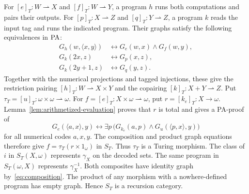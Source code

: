 For $[e]_T:W\rightharpoonup X$ and $[f]_T:W\rightharpoonup Y$,
a program $h$ runs both computations and pairs their outputs.
For $[p]_T:X\rightharpoonup Z$ and $[q]_T:Y\rightharpoonup Z$,
a program $k$ reads the input tag and runs the indicated program.
Their graphs satisfy the following equivalences in $\mathrm{PA}$:
\[
 \begin{aligned}
 G_h(w,\langle x,y\rangle)&\longleftrightarrow G_e(w,x)\land G_f(w,y),\\
 G_k(2x,z)&\longleftrightarrow G_p(x,z),\\
 G_k(2y+1,z)&\longleftrightarrow G_q(y,z).
 \end{aligned}
\]
Together with the numerical projections and tagged injections,
these give the restriction pairing $[h]_T:W\rightharpoonup X\times Y$
and the copairing $[k]_T:X+Y\rightharpoonup Z$.
Put $\tau_T=[u]_T:\omega\times\omega\rightharpoonup\omega$.
For $f=[e]_T:X\times\omega\rightharpoonup\omega$, put
$r=[k_e]_T:X\to\omega$. Lemma~\ref{lem:arithmetized-evaluation}
proves that $r$ is total and gives a PA-proof of
\[
 G_e(\langle a,x\rangle,y)\leftrightarrow
 \exists p\,
 \bigl(G_{k_e}(a,p)\land G_u(\langle p,x\rangle,y)\bigr)
\]
for all numerical codes $a,x,y$.
The composition and product graph equations therefore give
$f=\tau_T(r\times1_\omega)$ in $S_T$.
Thus $\tau_T$ is a Turing morphism. The class of $i$ in
$S_T(X,\omega)$ represents $\gamma_X$ on the decoded sets.
The same program in $S_T(\omega,X)$ represents $\gamma_X^{-1}$.
Both composites have identity graph by~\eqref{eq:composition}.
The product of any morphism with a nowhere-defined program has
empty graph. Hence $S_T$ is a recursion category.


